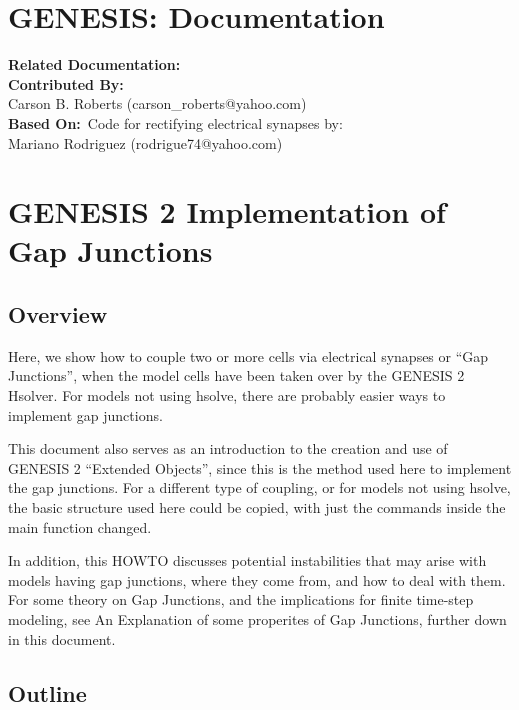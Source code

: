 \documentclass[12pt]{article}
\begin{document}
\section*{GENESIS: Documentation}

{\bf Related Documentation:}
{\\\bf Contributed By:}\\
Carson B. Roberts (carson\_roberts@yahoo.com)
{\\\bf Based On:}\
Code for rectifying electrical synapses by: \\
Mariano Rodriguez (rodrigue74@yahoo.com)

\section*{GENESIS 2 Implementation of Gap Junctions}

\subsection*{Overview}

Here, we show how to couple two or more cells via electrical synapses or ``Gap Junctions'', when the model cells have been taken over by the GENESIS 2 Hsolver. For models not using hsolve, there are probably easier ways to implement gap junctions.

This document also serves as an introduction to the creation and use of GENESIS 2 ``Extended Objects'', since this is the method used here to implement the gap junctions. For a different type of coupling, or for models not using hsolve, the basic structure used here could be copied, with just the commands inside the main function changed.

In addition, this HOWTO discusses potential instabilities that may arise with models having gap junctions, where they come from, and how to deal with them. For some theory on Gap Junctions, and the implications for finite time-step modeling, see An Explanation of some properites of Gap Junctions, further down in this document.

\subsection*{Outline}
\end{document}
